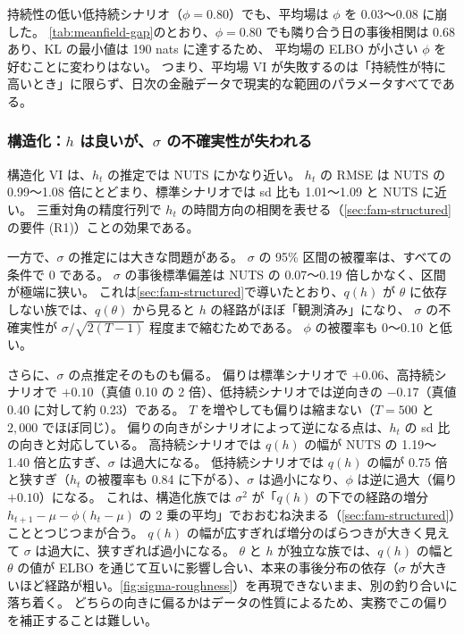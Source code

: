 持続性の低い低持続シナリオ（$\phi = 0.80$）でも、平均場は $\phi$ を 0.03〜0.08 に崩した。
\cref{tab:meanfield-gap}のとおり、$\phi = 0.80$ でも隣り合う日の事後相関は 0.68 あり、KL の最小値は 190 nats に達するため、
平均場の ELBO が小さい $\phi$ を好むことに変わりはない。
つまり、平均場 VI が失敗するのは「持続性が特に高いとき」に限らず、日次の金融データで現実的な範囲のパラメータすべてである。

\subsubsection{構造化：$h$ は良いが、$\sigma$ の不確実性が失われる}

構造化 VI は、$h_t$ の推定では NUTS にかなり近い。
$h_t$ の RMSE は NUTS の 0.99〜1.08 倍にとどまり、標準シナリオでは sd 比も 1.01〜1.09 と NUTS に近い。
三重対角の精度行列で $h_t$ の時間方向の相関を表せる（\cref{sec:fam-structured}の要件 (R1)）ことの効果である。

一方で、$\sigma$ の推定には大きな問題がある。
$\sigma$ の 95\% 区間の被覆率は、すべての条件で 0 である。
$\sigma$ の事後標準偏差は NUTS の 0.07〜0.19 倍しかなく、区間が極端に狭い。
これは\cref{sec:fam-structured}で導いたとおり、$q(h)$ が $\theta$ に依存しない族では、$q(\theta)$ から見ると $h$ の経路がほぼ「観測済み」になり、
$\sigma$ の不確実性が $\sigma / \sqrt{2(T-1)}$ 程度まで縮むためである。
$\phi$ の被覆率も 0〜0.10 と低い。

さらに、$\sigma$ の点推定そのものも偏る。
偏りは標準シナリオで $+0.06$、高持続シナリオで $+0.10$（真値 0.10 の 2 倍）、低持続シナリオでは逆向きの $-0.17$（真値 0.40 に対して約 0.23）である。
$T$ を増やしても偏りは縮まない（$T = 500$ と $2{,}000$ でほぼ同じ）。
偏りの向きがシナリオによって逆になる点は、$h_t$ の sd 比の向きと対応している。
高持続シナリオでは $q(h)$ の幅が NUTS の 1.19〜1.40 倍と広すぎ、$\sigma$ は過大になる。
低持続シナリオでは $q(h)$ の幅が 0.75 倍と狭すぎ（$h_t$ の被覆率も 0.84 に下がる）、$\sigma$ は過小になり、$\phi$ は逆に過大（偏り $+0.10$）になる。
これは、構造化族では $\sigma^2$ が「$q(h)$ の下での経路の増分 $h_{t+1} - \mu - \phi(h_t - \mu)$ の 2 乗の平均」でおおむね決まる（\cref{sec:fam-structured}）こととつじつまが合う。
$q(h)$ の幅が広すぎれば増分のばらつきが大きく見えて $\sigma$ は過大に、狭すぎれば過小になる。
$\theta$ と $h$ が独立な族では、$q(h)$ の幅と $\theta$ の値が ELBO を通じて互いに影響し合い、本来の事後分布の依存（$\sigma$ が大きいほど経路が粗い。\cref{fig:sigma-roughness}）を再現できないまま、別の釣り合いに落ち着く。
どちらの向きに偏るかはデータの性質によるため、実務でこの偏りを補正することは難しい。

